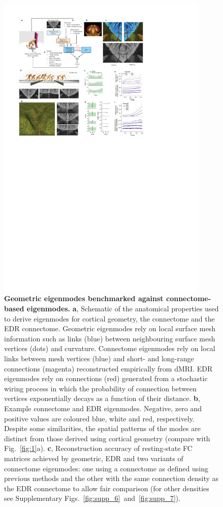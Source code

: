 \documentclass[sn-mathphys-num]{sn-jnl}%
\theoremstyle{thmstyleone}%
\theoremstyle{thmstyletwo}%
\theoremstyle{thmstylethree}%
\begin{document}
\begin{figure}[!htb]
	\centering
	\includegraphics[width=0.9\textwidth]{fig/fig_4.pdf}
	\caption{\textbf{Geometric eigenmodes benchmarked against connectome-based eigenmodes.}
	\textbf{a}, Schematic of the anatomical properties used to derive eigenmodes for cortical geometry, the connectome and the EDR connectome. 
	Geometric eigenmodes rely on local surface mesh information such as links (blue) between neighbouring surface mesh vertices (dots) and curvature. 
	Connectome eigenmodes rely on local links between mesh vertices (blue) and short- and long-range connections (magenta) reconstructed empirically from dMRI. 
	EDR eigenmodes rely on connections (red) generated from a stochastic wiring process in which the probability of connection between vertices exponentially decays as a function of their distance.
	\textbf{b}, Example connectome and EDR eigenmodes. 
	Negative, zero and positive values are coloured blue, white and red, respectively. 
	Despite some similarities, the spatial patterns of the modes are distinct from those derived using cortical geometry (compare with Fig.~\ref{fig:1}a).
	\textbf{c}, Reconstruction accuracy of resting-state FC matrices achieved by geometric, EDR and two variants of connectome eigenmodes: 
	one using a connectome as defined using previous methods\cite{naze2021robustness} and the other with the same connection density as the EDR connectome to allow fair comparison (for other densities see Supplementary Figs.~\ref{fig:supp_6}~and~\ref{fig:supp_7}).
	} \label{fig:fig_4}
\end{figure}
\end{document}
